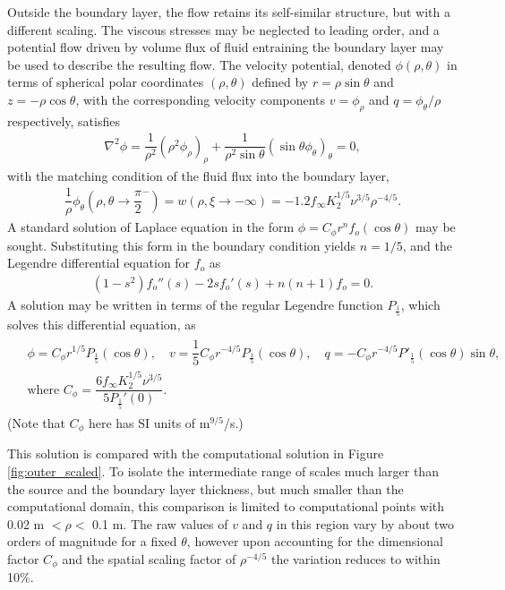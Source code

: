 \documentclass[]{jfm}
\begin{document}
Outside the boundary layer, the flow retains its self-similar structure, but with a different scaling.
The viscous stresses may be neglected to leading order, and a potential flow driven by volume flux of fluid entraining the boundary layer may be used to describe the resulting flow.
The velocity potential, denoted $\phi(\rho,\theta)$ in terms of spherical polar coordinates $(\rho, \theta)$ defined by $r = \rho \sin \theta$ and $z=-\rho \cos\theta$, with the corresponding velocity components $v=\phi_\rho$ and $q=\phi_\theta/\rho$ respectively, satisfies
\begin{align}
 \nabla^2 \phi = \dfrac{1}{\rho^2} \left(\rho^2 \phi_\rho \right)_\rho + \dfrac{1}{\rho^2\sin\theta}\left(\sin\theta \phi_{\theta}\right)_\theta = 0,
\end{align}
with the matching condition of the fluid flux into the boundary layer,
\begin{align}
 \dfrac{1}{\rho}\phi_\theta(\rho, \theta\to \dfrac{\pi}{2}^{-}) =  w(\rho, \xi\to -\infty) = -1.2f_\infty K_2^{1/5} \nu^{3/5}\rho^{-4/5}.
 \label{eqn:matchingvel}
\end{align}
A standard solution of Laplace equation in the form $\phi = C_\phi r^n f_o(\cos\theta)$ may be sought.
Substituting this form in the boundary condition yields $n=1/5$, and the Legendre differential equation for $f_o$ as
\begin{align}
 (1-s^2) f_o''(s) - 2 s f_o'(s) + n(n+1) f_o = 0.
\end{align}
A solution may be written in terms of the regular Legendre function $P_\frac{1}{5}$, which solves this differential equation, as
\begin{align}
\begin{split}
 &\phi = C_\phi r^{1/5} P_\frac{1}{5}(\cos\theta), \quad 
 v = \dfrac{1}{5} C_\phi r^{-4/5} P_\frac{1}{5}(\cos\theta), \quad
 q = -C_\phi r^{-4/5} P'_\frac{1}{5}(\cos\theta) \sin\theta, \\
 &\text{where } C_\phi = \dfrac{6 f_\infty K_2^{1/5} \nu^{3/5}}{5P_\frac{1}{5}'(0)}.
\end{split}
\label{eqn:outersol}
\end{align}
(Note that $C_\phi$ here has SI units of m$^{9/5}$/s.)

This solution is compared with the computational solution in Figure \ref{fig:outer_scaled}.
To isolate the intermediate range of scales much larger than the source and the boundary layer thickness, but much smaller than the computational domain, this comparison is limited to computational points with 0.02 m $< \rho <$ 0.1 m.
The raw values of $v$ and $q$ in this region vary by about two orders of magnitude for a fixed $\theta$, however upon accounting for the dimensional factor $C_\phi$ and the spatial scaling factor of $\rho^{-4/5}$ the variation reduces to within 10\%.
\end{document}
